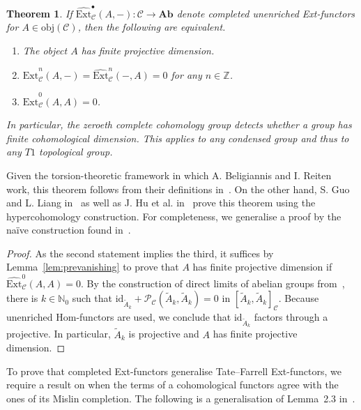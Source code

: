 \documentclass[12pt, a4paper]{article}
\numberwithin{equation}{section}
\newtheorem{thm}{Theorem}[section]
\theoremstyle{empty}
\theoremstyle{nonumberplain}
\newtheorem{proof}{Proof}
\begin{document}
\begin{thm}\label{thm:realvanishing}
If $\widehat{\mathrm{Ext}}_{\mathcal{C}}^{\bullet}(A, -): \mathcal{C} \rightarrow \mathbf{Ab}$ denote completed unenriched Ext-functors for $A \in \mathrm{obj}(\mathcal{C})$, then the following are equivalent.
\begin{enumerate}
\item The object $A$ has finite projective dimension.
\item $\widehat{\mathrm{Ext}}_{\mathcal{C}}^n(A, -) = \widehat{\mathrm{Ext}}_{\mathcal{C}}^n(-, A) = 0$ for any $n \in \mathbb{Z}$.
\item $\widehat{\mathrm{Ext}}_{\mathcal{C}}^0(A, A) = 0$.
\end{enumerate}
In particular, the zeroeth complete cohomology group detects whether a group has finite cohomological dimension. This applies to any condensed group and thus to any $T1$ topological group.
\end{thm}

Given the torsion-theoretic framework in which A.\! Beligiannis and I.\! Reiten work, this theorem follows from their definitions in~\cite{bel07}. On the other hand, S.\! Guo and L.\! Liang in~\cite{guo23} as well as J.\! Hu et al.\! in~\cite{hu21} prove this theorem using the hypercohomology construction. For completeness, we generalise a proof by the naïve construction found in~\cite[p.~205]{kro95}.

\begin{proof}
As the second statement implies the third, it suffices by Lemma~\ref{lem:prevanishing} to prove that $A$ has finite projective dimension if $\widehat{\mathrm{Ext}}_{\mathcal{C}}^0(A, A) = 0$. By the construction of direct limits of abelian groups from~\cite[p.~261]{osb00}, there is $k \in \mathbb{N}_0$ such that $\mathrm{id}_{\widetilde{A}_k} + \mathcal{P}_{\mathcal{C}}(\widetilde{A}_k, \widetilde{A}_k) = 0$ in $[\widetilde{A}_k, \widetilde{A}_k]_{\mathcal{C}}$. Because unenriched Hom-functors are used, we conclude that $\mathrm{id}_{\widetilde{A}_k}$ factors through a projective. In particular, $\widetilde{A}_k$ is projective and $A$ has finite projective dimension.
\end{proof}

To prove that completed Ext-functors generalise Tate--Farrell Ext-functors, we require a result on when the terms of a cohomological functors agree with the ones of its Mislin completion. The following is a generalisation of Lemma~2.3 in~\cite{mis94}.
\end{document}
